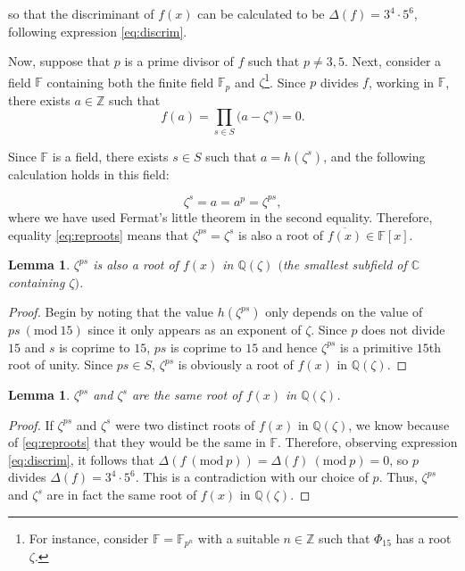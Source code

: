 \documentclass[a4paper, 12pt]{article}
\newtheorem{lemma}[theorem]{Lemma}
\theoremstyle{definition}
\theoremstyle{remark}
\newcommand{\Z}{\ensuremath{\mathbb{Z}}}
\newcommand{\C}{\ensuremath{\mathbb{C}}}
\newcommand{\Q}{\ensuremath{\mathbb{Q}}}
\newcommand{\F}{\ensuremath{\mathbb{F}}}
\newcommand{\Mod}[1]{\ (\mathrm{mod}\ #1)} %
\begin{document}
so that the discriminant of $f(x)$ can be calculated to be $\Delta(f)=3^{4} \cdot 5^{6}$, following expression \eqref{eq:discrim}.
 
Now, suppose that $p$ is a prime divisor of $f$ such that $p\neq3, 5$. Next, consider a field $\F$ containing both the finite field $\F_p$ and $\zeta$\footnote{For instance, consider $\F=\F_{p^n}$ with a suitable $n\in\Z$ such that $\Phi_{15}$ has a root $\zeta$.}. Since $p$ divides $f$, working in $\F$, there exists $a\in\Z$ such that 
\begin{equation*}
f(a)=\prod_{s\in S}\big(a-\zeta^{s}\big)=0.
\end{equation*}

Since $\F$ is a field, there exists $s\in S$ such that $a=h(\zeta^{s})$, and the following calculation holds in this field:

\begin{equation}\label{eq:reproots}
\zeta^{s}=a=a^p=\zeta^{ps},
\end{equation}
where we have used Fermat's little theorem in the second equality. Therefore, equality \eqref{eq:reproots} means that $\zeta^{ps}=\zeta^{s}$ is also a root of $\overline{f(x)}\in\F[x]$. 

\begin{lemma}
$\zeta^{ps}$ is also a root of $f(x)$ in $\Q(\zeta)$ $($the smallest subfield of $\C$ containing $\zeta)$.
\end{lemma}
\begin{proof}
Begin by noting that the value $h(\zeta^{ps})$ only depends on the value of $ps \Mod{15}$ since it only appears as an exponent of $\zeta$. Since $p$ does not divide $15$ and $s$ is coprime to $15$, $ps$ is coprime to $15$ and hence $\zeta^{ps}$ is a primitive $15$th root of unity. Since $ps\in S$, $\zeta^{ps}$ is obviously a root of $f(x)$ in $\Q(\zeta)$.
\end{proof}

\begin{lemma}
$\zeta^{ps}$ and $\zeta^{s}$ are the same root of $f(x)$ in $\Q(\zeta)$.
\end{lemma}
\begin{proof}
If $\zeta^{ps}$ and $\zeta^{s}$ were two distinct roots of $f(x)$ in $\Q(\zeta)$, we know because of \eqref{eq:reproots} that they would be the same in $\F$. Therefore, observing expression \eqref{eq:discrim}, it follows that $\Delta(f \Mod{p})=\Delta(f) \Mod{p}=0$, so $p$ divides $\Delta(f)=3^{4} \cdot 5^{6}$. This is a contradiction with our choice of $p$. Thus, $\zeta^{ps}$ and $\zeta^{s}$ are in fact the same root of $f(x)$ in $\Q(\zeta)$.
\end{proof}
\end{document}
